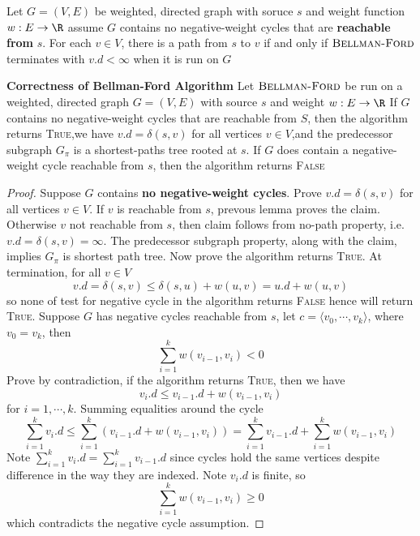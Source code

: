 \documentclass[11pt]{article}
\begin{document}
\begin{corollary*}
    Let $G = (V,E)$ be weighted, directed graph with soruce $s$ and weight function $w:E\to\R$ assume $G$ contains no negative-weight cycles that are \textbf{reachable from} $s$. For each $v\in V$, there is a path from $s$ to $v$ if and only if $\textsc{Bellman-Ford}$ terminates with $v.d < \infty$ when it is run on $G$
\end{corollary*}


\begin{theorem*}
    \textbf{Correctness of Bellman-Ford Algorithm} Let $\textsc{Bellman-Ford}$ be run on a weighted, directed graph $G = (V,E)$ with source $s$ and weight $w: E\to\R$ If $G$ contains no negative-weight cycles that are reachable from $S$, then the algorithm returns \textsc{True},we have $v.d = \delta(s,v)$ for all vertices $v\in V$,and the predecessor subgraph $G_{\pi}$ is a shortest-paths tree rooted at $s$. If $G$ does contain a negative-weight cycle reachable from $s$, then the algorithm returns \textsc{False} 
    \begin{proof}
        Suppose $G$ contains \textbf{no negative-weight cycles}. Prove $v.d = \delta(s,v)$ for all vertices $v\in V$. If $v$ is reachable from $s$, prevous lemma proves the claim. Otherwise $v$ not reachable from $s$, then claim follows from no-path property, i.e. $v.d = \delta(s,v) = \infty$. The predecessor subgraph property, along with the claim, implies $G_{\pi}$ is shortest path tree. Now prove the algorithm returns \textsc{True}. At termination, for all $v\in V$
        \[
            v.d = \delta(s,v) \leq \delta(s,u) + w(u,v) = u.d + w(u,v)
        \]
        so none of test for negative cycle in the algorithm returns \textsc{False} hence will return \textsc{True}. Suppose $G$ has negative cycles reachable from $s$, let $c = \langle v_0, \cdots, v_k \rangle$, where $v_0 = v_k$, then 
        \[
            \sum_{i=1}^k w(v_{i-1} , v_i) < 0
        \]
        Prove by contradiction, if the algorithm returns \textsc{True}, then we have 
        \[
            v_i.d \leq v_{i-1}.d + w(v_{i-1}, v_i)
        \]
        for $i = 1,\cdots, k$. Summing equalities around the cycle 
        \[
            \sum_{i=1}^k v_i.d \leq \sum_{i=1}^k (v_{i-1}.d + w(v_{i-1}, v_i)) = \sum_{i=1}^k v_{i-1}.d + \sum_{i=1}^k w(v_{i-1}, v_i)
        \]
        Note $\sum_{i=1}^k v_{i}.d = \sum_{i=1}^k v_{i-1}.d$ since cycles hold the same vertices despite difference in the way they are indexed. Note $v_i.d$ is finite, so 
        \[
             \sum_{i=1}^k w(v_{i-1}, v_i) \geq 0
        \]
        which contradicts the negative cycle assumption. 
    \end{proof}
\end{theorem*}
\end{document}
